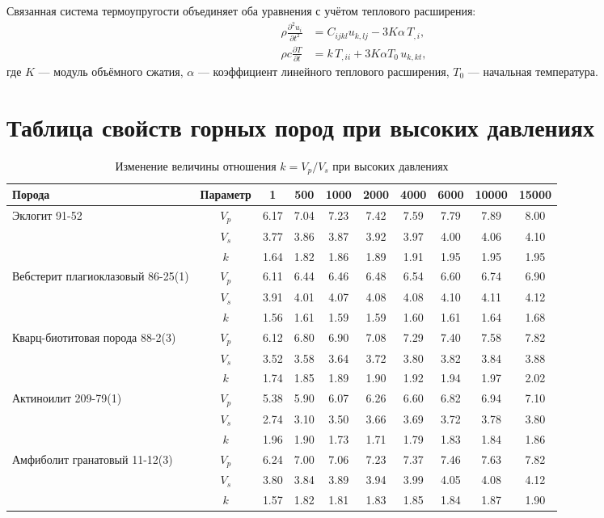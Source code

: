 \documentclass[12pt]{article}
\begin{document}
Связанная система термоупругости объединяет оба уравнения с учётом теплового расширения:
\begin{align}
\rho \frac{\partial^2 u_i}{\partial t^2} &= C_{ijkl} u_{k,lj} - 3 K \alpha \, T_{,i}, \\
\rho c \frac{\partial T}{\partial t} &= k \, T_{,ii} + 3 K \alpha T_0 \, u_{k,k t},
\end{align}
где $K$ — модуль объёмного сжатия, $\alpha$ — коэффициент линейного теплового расширения, $T_0$ — начальная температура.

\section{Таблица свойств горных пород при высоких давлениях}

\begin{longtable}{lccccccccc}
\caption{Изменение величины отношения $k = V_p / V_s$ при высоких давлениях} \\ 
\toprule
Порода & Параметр & 1 & 500 & 1000 & 2000 & 4000 & 6000 & 10000 & 15000 \\
\midrule
Эклогит 91-52 & $V_p$ & 6.17 & 7.04 & 7.23 & 7.42 & 7.59 & 7.79 & 7.89 & 8.00 \\
 & $V_s$ & 3.77 & 3.86 & 3.87 & 3.92 & 3.97 & 4.00 & 4.06 & 4.10 \\
 & $k$ & 1.64 & 1.82 & 1.86 & 1.89 & 1.91 & 1.95 & 1.95 & 1.95 \\
\midrule
Вебстерит плагиоклазовый 86-25(1) & $V_p$ & 6.11 & 6.44 & 6.46 & 6.48 & 6.54 & 6.60 & 6.74 & 6.90 \\
 & $V_s$ & 3.91 & 4.01 & 4.07 & 4.08 & 4.08 & 4.10 & 4.11 & 4.12 \\
 & $k$ & 1.56 & 1.61 & 1.59 & 1.59 & 1.60 & 1.61 & 1.64 & 1.68 \\
\midrule
Кварц-биотитовая порода 88-2(3) & $V_p$ & 6.12 & 6.80 & 6.90 & 7.08 & 7.29 & 7.40 & 7.58 & 7.82 \\
 & $V_s$ & 3.52 & 3.58 & 3.64 & 3.72 & 3.80 & 3.82 & 3.84 & 3.88 \\
 & $k$ & 1.74 & 1.85 & 1.89 & 1.90 & 1.92 & 1.94 & 1.97 & 2.02 \\
\midrule
Актиноилит 209-79(1) & $V_p$ & 5.38 & 5.90 & 6.07 & 6.26 & 6.60 & 6.82 & 6.94 & 7.10 \\
 & $V_s$ & 2.74 & 3.10 & 3.50 & 3.66 & 3.69 & 3.72 & 3.78 & 3.80 \\
 & $k$ & 1.96 & 1.90 & 1.73 & 1.71 & 1.79 & 1.83 & 1.84 & 1.86 \\
\midrule
Амфиболит гранатовый 11-12(3) & $V_p$ & 6.24 & 7.00 & 7.06 & 7.23 & 7.37 & 7.46 & 7.63 & 7.82 \\
 & $V_s$ & 3.80 & 3.84 & 3.89 & 3.94 & 3.99 & 4.05 & 4.08 & 4.12 \\
 & $k$ & 1.57 & 1.82 & 1.81 & 1.83 & 1.85 & 1.84 & 1.87 & 1.90 \\
\bottomrule
\end{longtable}
\end{document}
